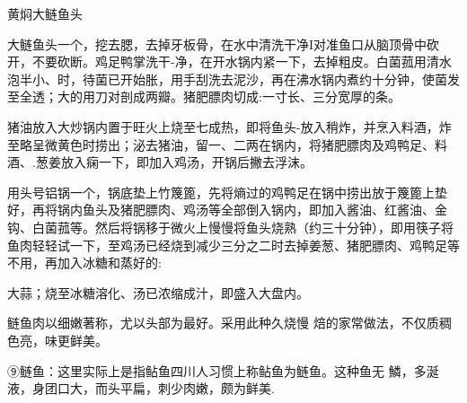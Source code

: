 \begin{recipe}{黄焖大鲢鱼头}

\ingredients


\cooking

\step 大鲢鱼头一个，挖去腮，去掉牙板骨，在水中清洗干净I对准鱼口从脑顶骨中砍开，不要砍断。鸡足鸭掌洗干-净，在开水锅内紧一下，去掉粗皮。白菌菰用清水泡半小、时，待菌已开始胀，用手刮洗去泥沙，再在沸水锅内煮约十分钟，使菌发至全透；大的用刀对剖成两瓣。猪肥膘肉切成:一寸长、三分宽厚的条。

\step 猪油放入大炒锅内置于旺火上烧至七成热，即将鱼头-放入稍炸，并烹入料酒，炸至略呈微黄色时捞出；泌去猪油，留一、二两在锅内，将猪肥膘肉及鸡鸭足、料酒、.葱姜放入痫一下，即加入鸡汤，开锅后撇去浮沫。

\step 用头号铝锅一个，锅底垫上竹篾篦，先将熵过的鸡鸭足在锅中捞出放于篾篦上垫好，再将锅内鱼头及猪肥膘肉、鸡汤等全部倒入锅内，即加入酱油、红酱油、金钩、白菌菰等。然后将锅移于微火上慢慢将鱼头烧熟（约三十分钟），即用筷子将鱼肉轻轻试一下，至鸡汤已经烧到减少三分之二时去掉姜葱、猪肥膘肉、鸡鸭足等不用，再加入冰糖和蒸好的:

大蒜；烧至冰糖溶化、汤已浓缩成汁，即盛入大盘内。

\notes

鲢鱼肉以细嫩著称，尤以头部为最好。采用此种久烧慢 焙的家常做法，不仅质稠色亮，味更鲜美。

⑨鲢鱼：这里实际上是指鲇鱼四川人习惯上称鲇鱼为鲢鱼。这种鱼无 鱗，多涎液，身团口大，而头平扁，刺少肉嫩，颇为鲜美.

\end{recipe}

